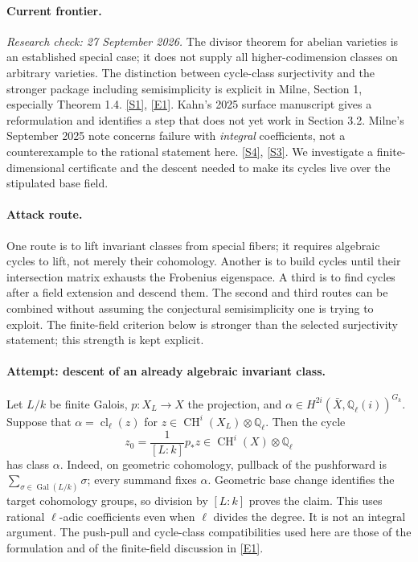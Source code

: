 \documentclass[11pt,a4paper]{article}
\newcommand{\Q}{\mathbb{Q}}
\newcommand{\sref}[2]{\hyperlink{source:#1:#2}{[S#2]}}
\newcommand{\eref}[2]{\hyperlink{extra:#1:#2}{[E#2]}}
\begin{document}
\paragraph{Current frontier.}
\textit{Research check: 27 September 2026.}
The divisor theorem for abelian varieties is an established special case;
it does not supply all higher-codimension classes on arbitrary varieties.
The distinction between cycle-class surjectivity and the stronger package
including semisimplicity is explicit in Milne, Section 1, especially
Theorem 1.4. \sref{statement}{1}, \eref{statement}{1}.
Kahn's 2025 surface manuscript gives a reformulation and identifies a step
that does not yet work in Section 3.2. Milne's September 2025 note concerns
failure with \emph{integral} coefficients, not a counterexample to the
rational statement here. \sref{statement}{4}, \sref{statement}{3}.
We investigate a finite-dimensional certificate and the descent needed to
make its cycles live over the stipulated base field.

\paragraph{Attack route.}
One route is to lift invariant classes from special fibers; it requires
algebraic cycles to lift, not merely their cohomology. Another is to build
cycles until their intersection matrix exhausts the Frobenius eigenspace.
A third is to find cycles after a field extension and descend them. The
second and third routes can be combined without assuming the conjectural
semisimplicity one is trying to exploit. The finite-field criterion below
is stronger than the selected surjectivity statement; this strength is
kept explicit.

\paragraph{Attempt: descent of an already algebraic invariant class.}
Let $L/k$ be finite Galois, $p:X_L\to X$ the projection, and
$\alpha\in H^{2i}(\bar X,\Q_\ell(i))^{G_k}$. Suppose that
$\alpha=\operatorname{cl}_\ell(z)$ for
$z\in\operatorname{CH}^i(X_L)\otimes\Q_\ell$.
Then the cycle
\[
 z_0=\frac{1}{[L:k]}p_*z\in\operatorname{CH}^i(X)\otimes\Q_\ell
 \tag{15.1}
\]
has class $\alpha$. Indeed, on geometric cohomology, pullback of the
pushforward is $\sum_{\sigma\in\operatorname{Gal}(L/k)}\sigma$; every
summand fixes $\alpha$. Geometric base change identifies the target
cohomology groups, so division by $[L:k]$ proves the claim. This uses
rational $\ell$-adic coefficients even when $\ell$ divides the degree.
It is not an integral argument. The push-pull and cycle-class
compatibilities used here are those of the formulation and of the
finite-field discussion in \eref{statement}{1}.
\end{document}
